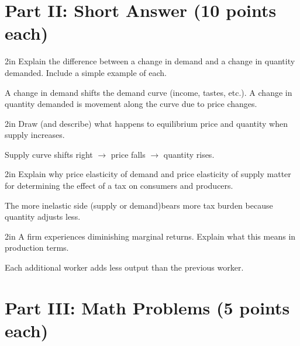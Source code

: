 \documentclass[12pt]{exam}
\begin{document}
\begin{questions}
    \section*{Part II: Short Answer (10 points each)}

    \begin{shortanswer}[10]{2in}
        Explain the difference between a change in demand and a change in quantity demanded. Include a simple example of each.
    \end{shortanswer}
    \begin{solution}
        A change in demand shifts the demand curve (income, tastes, etc.). A change in quantity demanded is movement along the curve due to price changes.
    \end{solution}

    \begin{shortanswer}[10]{2in}
        Draw (and describe) what happens to equilibrium price and quantity when supply increases.
    \end{shortanswer}
    \begin{solution}
        Supply curve shifts right $\rightarrow$ price falls $\rightarrow$ quantity rises.
    \end{solution}

    \begin{shortanswer}[10]{2in}
        Explain why price elasticity of demand and price elasticity of supply matter for
        determining the effect of a tax on consumers and producers.
    \end{shortanswer}
    \begin{solution}
        The more inelastic side (supply or demand)bears more tax burden because quantity adjusts less.
    \end{solution}

    \begin{shortanswer}[10]{2in}
        A firm experiences diminishing marginal returns. Explain what this means in production terms.
    \end{shortanswer}
    \begin{solution}
        Each additional worker adds less output than the previous worker.
    \end{solution}

    \section*{Part III: Math Problems (5 points each)}


\end{questions}
\end{document}
